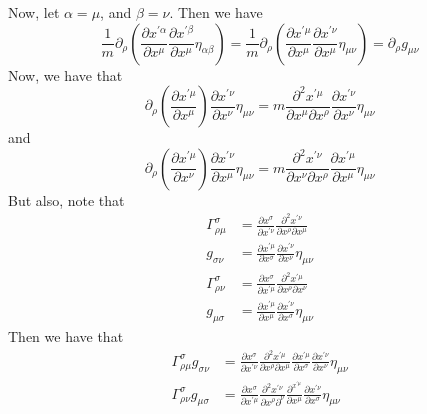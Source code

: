 \documentclass[12pt]{article}
\theoremstyle{definition}
\theoremstyle{remark}
\begin{document}
	Now, let $\alpha = \mu$, and $\beta = \nu$.  Then we have 
	\[
	\frac{1}{m} \partial_{\rho} 
	\left( \frac{ \partial x^{ \prime \alpha } }{ \partial x^{ \mu } } 
	\frac{ \partial x^{ \prime \beta } }{ \partial x^{ \mu } } 
	\eta_{ \alpha \beta } \right)
	=
	\frac{ 1}{m} \partial_{\rho} 
	\left( \frac{ \partial x^{ \prime \mu } }{ \partial x^{ \mu } } 
	\frac{ \partial x^{ \prime \nu } }{ \partial x^{ \mu } } 
	\eta_{ \mu \nu } \right)
	=
	\partial_{ \rho } g_{ \mu \nu }
	\]
	Now, we have that 
	\[
	\partial_{ \rho } \left( \frac{ \partial x^{ \prime \mu } }{ \partial x^{ \mu }} \right)
	\frac{ \partial x^{ \prime \nu } }{ \partial x^{ \nu } } \eta_{ \mu \nu } 
	=
	m \frac{ \partial^2 x^{ \prime \mu } }{ \partial x^{ \mu } \partial x^{ \rho } } \frac{ \partial x^{ \prime \nu } }{ \partial x^{ \nu } } \eta_{ \mu \nu } 
	\]
	and 
	\[
	\partial_{ \rho } \left( \frac{ \partial x^{ \prime \mu } }{ \partial x^{ \nu } } \right) 
	\frac{ \partial x^{ \prime \nu } }{ \partial x^{ \mu } } \eta_{ \mu \nu } 
	= 
	 m \frac{ \partial^2 x^{ \prime \nu } }{ \partial x^{ \nu } \partial x^{ \rho } } 
	 \frac{ \partial x^{ \prime \mu } }{ \partial x^{ \mu } } \eta_{ \mu \nu } 
	\]
	But also, note that 
	\begin{align*}
	\Gamma^{ \sigma }_{ \rho \mu } &= \frac{ \partial x^{ \sigma } }{ \partial x^{ \prime \nu } } \frac{ \partial^{2} x^{ \prime \nu } }{ \partial x^{ \rho } \partial x^{ \mu } } \\
	g_{ \sigma \nu } &= \frac{ \partial x^{ \prime \mu } }{ \partial x^{ \sigma }} 
	\frac{ \partial x^{ \prime \nu } }{ \partial x^{ \nu } } \eta_{ \mu \nu } \\
	\Gamma^{ \sigma }_{ \rho \nu } &= \frac{ \partial x^{ \sigma } }{ \partial x^{ \prime \mu } } \frac{ \partial^2 x^{ \prime \mu } }{ \partial x^{ \rho } \partial x^{ \nu } } \\
	g_{ \mu \sigma } &= \frac{ \partial x^{ \prime \mu } }{ \partial x^{ \mu } } \frac{ \partial x^{ \prime \nu } }{ \partial x^{ \sigma } } \eta_{ \mu \nu }
	\end{align*}
	Then we have that 
	\begin{align*}
	\Gamma_{\rho \mu }^{ \sigma } g_{ \sigma \nu } 
	&= 
	\frac{ \partial x^{ \sigma } }{ \partial x^{ \prime \nu } } 
	\frac{ \partial^2 x^{ \prime \mu } }{ \partial x^{ \rho } \partial x^{ \mu } } 
	\frac{ \partial x^{ \prime \mu }}{ \partial x^{ \sigma } } 
	\frac{ \partial x^{ \prime \nu } }{ \partial x^{ \nu } } \eta_{ \mu \nu } \\
	\Gamma_{ \rho \nu }^{ \sigma } g_{ \mu \sigma } 
	&= 
	\frac{ \partial x^{ \sigma } }{ \partial x^{ \prime \mu } } 
	\frac{ \partial^2 x^{ \prime \nu } }{ \partial x^{ \rho }  \partial ^{ \nu } } 
	\frac{ \partial^{ x^{ \prime \mu } } }{ \partial x^{ \mu } } 
	\frac{ \partial x^{ \prime \nu } }{ \partial x^{\sigma } } \eta_{ \mu \nu } 
	\end{align*}
\end{document}
